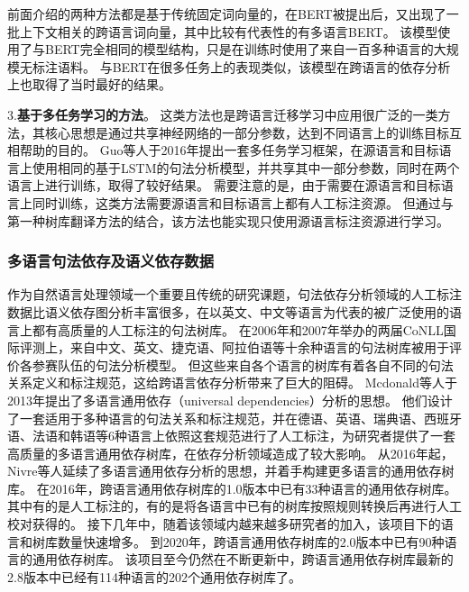 前面介绍的两种方法都是基于传统固定词向量的，在BERT被提出后，又出现了一批上下文相关的跨语言词向量\cite{conneau-etal-2019-cross,conneau-etal-2020-unsupervised}，其中比较有代表性的有多语言BERT。
该模型使用了与BERT完全相同的模型结构，只是在训练时使用了来自一百多种语言的大规模无标注语料。
与BERT在很多任务上的表现类似，该模型在跨语言的依存分析上也取得了当时最好的结果\cite{kondratyuk-etal-2019-languages}。

3.\textbf{基于多任务学习的方法}。
这类方法也是跨语言迁移学习中应用很广泛的一类方法，其核心思想是通过共享神经网络的一部分参数，达到不同语言上的训练目标互相帮助的目的。
Guo等人\cite{guo-etal-2016-universal}于2016年提出一套多任务学习框架，在源语言和目标语言上使用相同的基于LSTM的句法分析模型，并共享其中一部分参数，同时在两个语言上进行训练，取得了较好结果。
需要注意的是，由于需要在源语言和目标语言上同时训练，这类方法需要源语言和目标语言上都有人工标注资源。
但通过与第一种树库翻译方法的结合，该方法也能实现只使用源语言标注资源进行学习。

\subsubsection{多语言句法依存及语义依存数据}

作为自然语言处理领域一个重要且传统的研究课题，句法依存分析领域的人工标注数据比语义依存图分析丰富很多，在以英文、中文等语言为代表的被广泛使用的语言上都有高质量的人工标注的句法树库。
在2006年\cite{buchholz-marsi-2006-conllx}和2007年\cite{nivre-etal-2007-conll}举办的两届CoNLL国际评测上，来自中文、英文、捷克语、阿拉伯语等十余种语言的句法树库被用于评价各参赛队伍的句法分析模型。
但这些来自各个语言的树库有着各自不同的句法关系定义和标注规范，这给跨语言依存分析带来了巨大的阻碍。
Mcdonald等人于2013年提出了多语言通用依存（universal dependencies）分析的思想\cite{mcdonald-etal-2013-universal}。
他们设计了一套适用于多种语言的句法关系和标注规范，并在德语、英语、瑞典语、西班牙语、法语和韩语等6种语言上依照这套规范进行了人工标注，为研究者提供了一套高质量的多语言通用依存树库，在依存分析领域造成了较大影响。
从2016年起，Nivre等人延续了多语言通用依存分析的思想，并着手构建更多语言的通用依存树库。
在2016年，跨语言通用依存树库的1.0版本\cite{nivre-2016-etal-universal}中已有33种语言的通用依存树库。
其中有的是人工标注的，有的是将各语言中已有的树库按照规则转换后再进行人工校对获得的。
接下几年中，随着该领域内越来越多研究者的加入，该项目下的语言和树库数量快速增多。
到2020年，跨语言通用依存树库的2.0版本\cite{nivre-etal-2020-universal}中已有90种语言的通用依存树库。
该项目至今仍然在不断更新中，跨语言通用依存树库最新的2.8版本中已经有114种语言的202个通用依存树库了。

